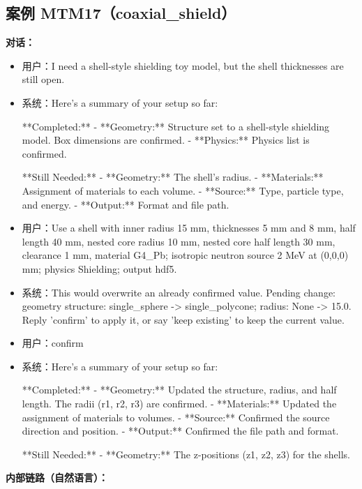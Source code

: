 \documentclass[11pt]{ctexart}
\begin{document}
\subsection{案例 MTM17（coaxial\_shield）}
\textbf{对话：}
\begin{itemize}
\item 用户：I need a shell-style shielding toy model, but the shell thicknesses are still open.
\item 系统：Here's a summary of your setup so far:

**Completed:**
- **Geometry:** Structure set to a shell-style shielding model. Box dimensions are confirmed.
- **Physics:** Physics list is confirmed.

**Still Needed:**
- **Geometry:** The shell's radius.
- **Materials:** Assignment of materials to each volume.
- **Source:** Type, particle type, and energy.
- **Output:** Format and file path.
\item 用户：Use a shell with inner radius 15 mm, thicknesses 5 mm and 8 mm, half length 40 mm, nested core radius 10 mm, nested core half length 30 mm, clearance 1 mm, material G4\_Pb; isotropic neutron source 2 MeV at (0,0,0) mm; physics Shielding; output hdf5.
\item 系统：This would overwrite an already confirmed value. Pending change: geometry structure: single\_sphere -> single\_polycone; radius: None -> 15.0. Reply 'confirm' to apply it, or say 'keep existing' to keep the current value.
\item 用户：confirm
\item 系统：Here's a summary of your setup so far:

**Completed:**
- **Geometry:** Updated the structure, radius, and half length. The radii (r1, r2, r3) are confirmed.
- **Materials:** Updated the assignment of materials to volumes.
- **Source:** Confirmed the source direction and position.
- **Output:** Confirmed the file path and format.

**Still Needed:**
- **Geometry:** The z-positions (z1, z2, z3) for the shells.
\end{itemize}
\textbf{内部链路（自然语言）：}
\end{document}
